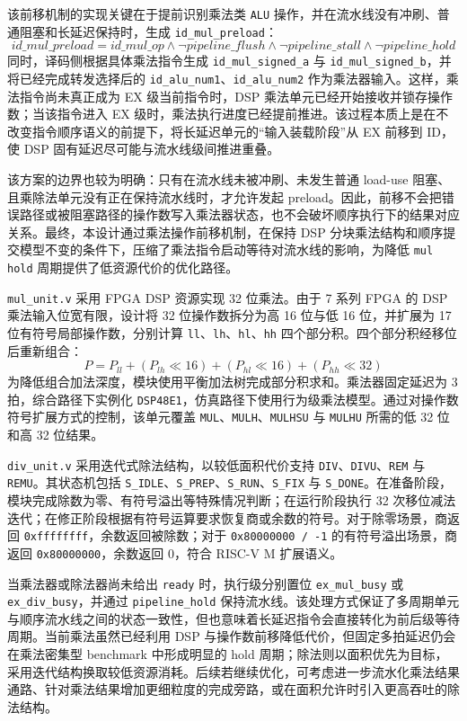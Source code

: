 ﻿\documentclass[12pt,a4paper]{ctexart}
\begin{document}
    该前移机制的实现关键在于提前识别乘法类 \texttt{ALU} 操作，并在流水线没有冲刷、普通阻塞和长延迟保持时，生成 \texttt{id\_mul\_preload}：
    \[
        id\_mul\_preload = id\_mul\_op \land \lnot pipeline\_flush
                         \land \lnot pipeline\_stall \land \lnot pipeline\_hold
    \]
    同时，译码侧根据具体乘法指令生成 \texttt{id\_mul\_signed\_a} 与 \texttt{id\_mul\_signed\_b}，并将已经完成转发选择后的 \texttt{id\_alu\_num1}、\texttt{id\_alu\_num2} 作为乘法器输入。这样，乘法指令尚未真正成为 EX 级当前指令时，DSP 乘法单元已经开始接收并锁存操作数；当该指令进入 EX 级时，乘法执行进度已经提前推进。该过程本质上是在不改变指令顺序语义的前提下，将长延迟单元的“输入装载阶段”从 EX 前移到 ID，使 DSP 固有延迟尽可能与流水线级间推进重叠。

    该方案的边界也较为明确：只有在流水线未被冲刷、未发生普通 load-use 阻塞、且乘除法单元没有正在保持流水线时，才允许发起 preload。因此，前移不会把错误路径或被阻塞路径的操作数写入乘法器状态，也不会破坏顺序执行下的结果对应关系。最终，本设计通过乘法操作前移机制，在保持 DSP 分块乘法结构和顺序提交模型不变的条件下，压缩了乘法指令启动等待对流水线的影响，为降低 \texttt{mul hold} 周期提供了低资源代价的优化路径。

    \texttt{mul\_unit.v} 采用 FPGA DSP 资源实现 32 位乘法。由于 7 系列 FPGA 的 DSP 乘法输入位宽有限，设计将 32 位操作数拆分为高 16 位与低 16 位，并扩展为 17 位有符号局部操作数，分别计算 \texttt{ll}、\texttt{lh}、\texttt{hl}、\texttt{hh} 四个部分积。四个部分积经移位后重新组合：
    \[
        P = P_{ll} + (P_{lh} \ll 16) + (P_{hl} \ll 16) + (P_{hh} \ll 32)
    \]
    为降低组合加法深度，模块使用平衡加法树完成部分积求和。乘法器固定延迟为 3 拍，综合路径下实例化 \texttt{DSP48E1}，仿真路径下使用行为级乘法模型。通过对操作数符号扩展方式的控制，该单元覆盖 \texttt{MUL}、\texttt{MULH}、\texttt{MULHSU} 与 \texttt{MULHU} 所需的低 32 位和高 32 位结果。

    \texttt{div\_unit.v} 采用迭代式除法结构，以较低面积代价支持 \texttt{DIV}、\texttt{DIVU}、\texttt{REM} 与 \texttt{REMU}。其状态机包括 \texttt{S\_IDLE}、\texttt{S\_PREP}、\texttt{S\_RUN}、\texttt{S\_FIX} 与 \texttt{S\_DONE}。在准备阶段，模块完成除数为零、有符号溢出等特殊情况判断；在运行阶段执行 32 次移位减法迭代；在修正阶段根据有符号运算要求恢复商或余数的符号。对于除零场景，商返回 \texttt{0xffffffff}，余数返回被除数；对于 \texttt{0x80000000 / -1} 的有符号溢出场景，商返回 \texttt{0x80000000}，余数返回 0，符合 RISC-V M 扩展语义。

    当乘法器或除法器尚未给出 \texttt{ready} 时，执行级分别置位 \texttt{ex\_mul\_busy} 或 \texttt{ex\_div\_busy}，并通过 \texttt{pipeline\_hold} 保持流水线。该处理方式保证了多周期单元与顺序流水线之间的状态一致性，但也意味着长延迟指令会直接转化为前后级等待周期。当前乘法虽然已经利用 DSP 与操作数前移降低代价，但固定多拍延迟仍会在乘法密集型 benchmark 中形成明显的 hold 周期；除法则以面积优先为目标，采用迭代结构换取较低资源消耗。后续若继续优化，可考虑进一步流水化乘法结果通路、针对乘法结果增加更细粒度的完成旁路，或在面积允许时引入更高吞吐的除法结构。
\end{document}

